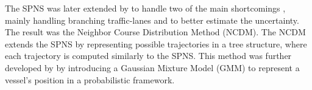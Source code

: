 The SPNS was later extended by \citeauthor{hexeberg} \cite{hexeberg} to handle two of the main shortcomings \cite{dalsnes-hexeberg}, mainly handling branching traffic-lanes and to better estimate the uncertainty. The result was the Neighbor Course Distribution Method (NCDM). The NCDM extends the SPNS by representing possible trajectories in a tree structure, where each trajectory is computed similarly to the SPNS. This method was further developed by \citeauthor{dalsnes-hexeberg}\cite{dalsnes-hexeberg} by introducing a Gaussian Mixture Model (GMM) to represent a vessel's position in a probabilistic framework.